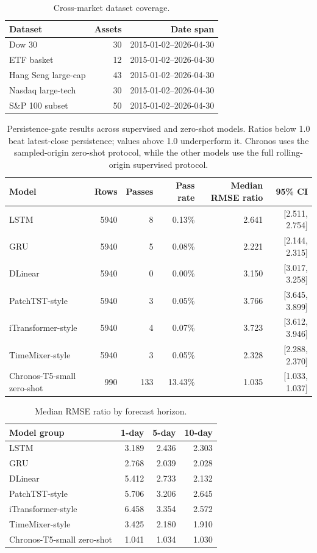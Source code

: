 \begin{table}[t]
\centering
\caption{Cross-market dataset coverage.}
\label{tab:dataset_coverage}
\begin{tabular}{lrr}
\toprule
Dataset & Assets & Date span \\
\midrule
Dow 30 & 30 & 2015-01-02--2026-04-30 \\
ETF basket & 12 & 2015-01-02--2026-04-30 \\
Hang Seng large-cap & 43 & 2015-01-02--2026-04-30 \\
Nasdaq large-tech & 30 & 2015-01-02--2026-04-30 \\
S\&P 100 subset & 50 & 2015-01-02--2026-04-30 \\
\bottomrule
\end{tabular}
\end{table}

\begin{table}[t]
\centering
\caption{Persistence-gate results across supervised and zero-shot models. Ratios below 1.0 beat latest-close persistence; values above 1.0 underperform it. Chronos uses the sampled-origin zero-shot protocol, while the other models use the full rolling-origin supervised protocol.}
\label{tab:model_gate_summary}
\begin{tabular}{lrrrrr}
\toprule
Model & Rows & Passes & Pass rate & Median RMSE ratio & 95\% CI \\
\midrule
LSTM & 5940 & 8 & 0.13\% & 2.641 & [2.511, 2.754] \\
GRU & 5940 & 5 & 0.08\% & 2.221 & [2.144, 2.315] \\
DLinear & 5940 & 0 & 0.00\% & 3.150 & [3.017, 3.258] \\
PatchTST-style & 5940 & 3 & 0.05\% & 3.766 & [3.645, 3.899] \\
iTransformer-style & 5940 & 4 & 0.07\% & 3.723 & [3.612, 3.946] \\
TimeMixer-style & 5940 & 3 & 0.05\% & 2.328 & [2.288, 2.370] \\
Chronos-T5-small zero-shot & 990 & 133 & 13.43\% & 1.035 & [1.033, 1.037] \\
\bottomrule
\end{tabular}
\end{table}

\begin{table}[t]
\centering
\caption{Median RMSE ratio by forecast horizon.}
\label{tab:horizon_summary}
\begin{tabular}{lrrr}
\toprule
Model group & 1-day & 5-day & 10-day \\
\midrule
LSTM & 3.189 & 2.436 & 2.303 \\
GRU & 2.768 & 2.039 & 2.028 \\
DLinear & 5.412 & 2.733 & 2.132 \\
PatchTST-style & 5.706 & 3.206 & 2.645 \\
iTransformer-style & 6.458 & 3.354 & 2.572 \\
TimeMixer-style & 3.425 & 2.180 & 1.910 \\
Chronos-T5-small zero-shot & 1.041 & 1.034 & 1.030 \\
\bottomrule
\end{tabular}
\end{table}
